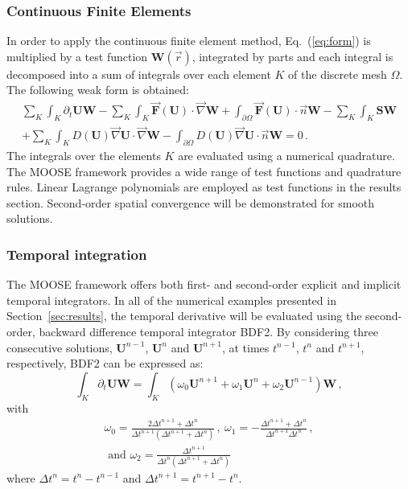 \documentclass[review,10pt]{elsarticle}
\newcommand{\grad}{\vec{\nabla}}
\newcommand{\eqt}[1]{Eq.~(\ref{#1})}                     %
\newcommand{\sct}[1]{Section~\ref{#1}}                   %
\begin{document}
\subsubsection{Continuous Finite Elements} 
In order to apply the continuous finite element method, \eqt{eq:form} is multiplied by a test function 
$\mathbf W(\vec{r})$, integrated by parts and each integral is decomposed into a sum of integrals over 
each element $K$ of the discrete mesh $\Omega$. The following weak form is obtained:
\begin{multline}\label{eq:cfem}
\sum_K \int_{K} \partial_t \mathbf U \mathbf W - \sum_K \int_{K} \vec{\mathbf F}(\mathbf U) \cdot \grad \mathbf W + \int_{\partial \Omega} \vec{\mathbf F}(\mathbf U) \cdot \vec{n} \mathbf W - \sum_K \int_{K} \mathbf S \mathbf W  \\
+ \sum_K \int_{K} D(\mathbf U) \grad \mathbf U \cdot \grad \mathbf W 
- \int_{\partial \Omega} D(\mathbf U) \grad \mathbf U \cdot \vec{n} \mathbf W = 0 \,.
\end{multline}
The integrals over the elements $K$ are evaluated using a numerical quadrature. The MOOSE framework 
provides a wide range of test functions and quadrature rules. Linear Lagrange polynomials are employed 
as test functions in the results section. Second-order spatial convergence will be demonstrated for smooth solutions. 
%
\subsubsection{Temporal integration} 
The MOOSE framework offers both first- and second-order explicit and implicit temporal integrators. 
In all of the numerical examples presented in \sct{sec:results}, the temporal derivative  will be 
evaluated using the second-order, backward difference temporal integrator BDF2. By considering three 
consecutive solutions, $\mathbf U^{n-1}$, $\mathbf U^n$ and $\mathbf U^{n+1}$, at times $t^{n-1}$, $t^n$ and $t^{n+1}$, respectively, BDF2 can be expressed as:
\begin{equation}
\label{eq:BDF2}
\int_{K} \partial_t \mathbf U \mathbf  W = \int_{K} \left( \omega_0 \mathbf U^{n+1}  + \omega_1 \mathbf U^n + \omega_2 \mathbf U^{n-1} \right) \mathbf W \,,
\end{equation}
%
with
\begin{multline}
\omega_0 =\frac{2\Delta t^{n+1}+\Delta t^n}{\Delta t^{n+1} \left( \Delta t^{n+1}+\Delta t^n \right)} \, , \ 
\omega_1 = -\frac{\Delta t^{n+1}+\Delta t^n}{\Delta t^{n+1} \Delta t^n}  \, , \\
\text{ and } \omega_2 = \frac{\Delta t^{n+1}}{\Delta t^n \left( \Delta t^{n+1} + \Delta t^n \right)} \nonumber
\end{multline}
where $\Delta t^{n} = t^n-t^{n-1}$ and $\Delta t^{n+1} = t^{n+1}-t^{n}$.
\end{document}
